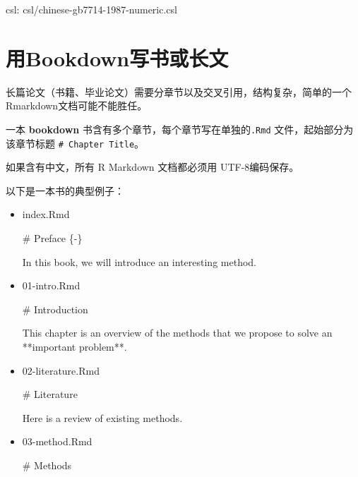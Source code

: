 \documentclass[]{article}
\newenvironment{Shaded}{\begin{snugshade}}{\end{snugshade}}
\newcommand{\FunctionTok}[1]{\textcolor[rgb]{0.00,0.00,0.00}{#1}}
\newcommand{\NormalTok}[1]{#1}
\begin{document}
csl: csl/chinese-gb7714-1987-numeric.csl

\hypertarget{bookdown}{%
\section{用Bookdown写书或长文}\label{bookdown}}

长篇论文（书籍、毕业论文）需要分章节以及交叉引用，结构复杂，简单的一个Rmarkdown文档可能不能胜任。

一本 \textbf{bookdown} 书含有多个章节，每个章节写在单独的\texttt{.Rmd}
文件，起始部分为该章节标题 \texttt{\#\ Chapter\ Title}。

如果含有中文，所有 R Markdown 文档都必须用 UTF-8编码保存。

以下是一本书的典型例子：

\begin{itemize}
\item
  index.Rmd

\begin{Shaded}
\begin{Highlighting}[]
\FunctionTok{# Preface \{-\}}

\NormalTok{In this book, we will introduce an interesting}
\NormalTok{method.}
\end{Highlighting}
\end{Shaded}
\item
  01-intro.Rmd

\begin{Shaded}
\begin{Highlighting}[]
\FunctionTok{# Introduction}

\NormalTok{This chapter is an overview of the methods that}
\NormalTok{we propose to solve an **important problem**.}
\end{Highlighting}
\end{Shaded}
\item
  02-literature.Rmd

\begin{Shaded}
\begin{Highlighting}[]
\FunctionTok{# Literature}

\NormalTok{Here is a review of existing methods.}
\end{Highlighting}
\end{Shaded}
\item
  03-method.Rmd

\begin{Shaded}
\begin{Highlighting}[]
\FunctionTok{# Methods}


\end{Highlighting}
\end{Shaded}
\end{itemize}
\end{document}
